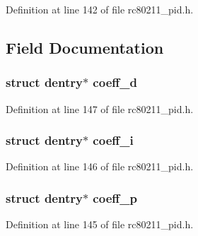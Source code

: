 Definition at line 142 of file rc80211\-\_\-pid.\-h.



\subsection{Field Documentation}
\hypertarget{structrc__pid__debugfs__entries_a8e02c39865c25ddbe3542a9f0ee711a1}{
\subsubsection[{coeff\-\_\-d}]{\setlength{\rightskip}{0pt plus 5cm}struct dentry$\ast$ coeff\-\_\-d}}\label{structrc__pid__debugfs__entries_a8e02c39865c25ddbe3542a9f0ee711a1}


Definition at line 147 of file rc80211\-\_\-pid.\-h.

\hypertarget{structrc__pid__debugfs__entries_ad6b82f12eff1d91fb126c328e1e9a160}{
\subsubsection[{coeff\-\_\-i}]{\setlength{\rightskip}{0pt plus 5cm}struct dentry$\ast$ coeff\-\_\-i}}\label{structrc__pid__debugfs__entries_ad6b82f12eff1d91fb126c328e1e9a160}


Definition at line 146 of file rc80211\-\_\-pid.\-h.

\hypertarget{structrc__pid__debugfs__entries_a1a4e446a756b61017c2b85a6d8fa70c5}{
\subsubsection[{coeff\-\_\-p}]{\setlength{\rightskip}{0pt plus 5cm}struct dentry$\ast$ coeff\-\_\-p}}\label{structrc__pid__debugfs__entries_a1a4e446a756b61017c2b85a6d8fa70c5}


Definition at line 145 of file rc80211\-\_\-pid.\-h.

